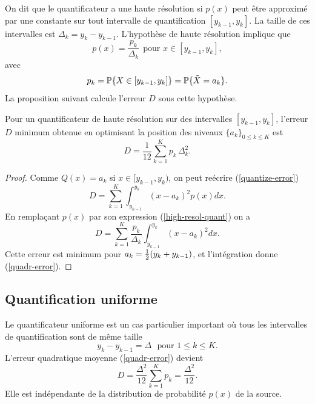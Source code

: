 On dit que le quantificateur a une haute
r\'esolution si
$p(x)$ peut \^etre approxim\'e par une constante sur tout intervalle
de quantification $[{y_{k-1}},{y_{k}}]$.
La taille de ces intervalles est $\Delta_k = y_k - y_{k-1}$.
L'hypoth\`ese de haute r\'esolution implique que
\begin{equation}
\label{high-resol-quant}
p(x) = \frac {p_k} {\Delta_k} ~~\mbox{pour $x \in [y_{k-1},{y_{k}}]$},
\end{equation}
avec
\[
p_k = \mathbb{P} \{X \in [{y_{k-1}},y_{k}] \} = \mathbb{P} \{ \tilde X = a_k \} .
\]
La proposition suivant calcule l'erreur $D$ sous cette hypoth\`ese.

\begin{proposition}
Pour un quantificateur de haute r\'esolution sur des intervalles
$[{y_{k-1}},{y_{k}}]$, l'erreur $D$
minimum obtenue en optimisant la position des niveaux
$\{ a_k \}_{0 \leq k \leq K}$ est
\begin{equation}
\label{quadr-error}
D = \frac 1 {12} \sum_{k=1}^{K} {p_k} \, {\Delta_k ^2} .
\end{equation}
\end{proposition}
\begin{proof}
Comme $Q(x) = a_k$ si
$x \in [y_{k-1},y_k)$, on peut re\'ecrire (\ref{quantize-error})
\[
D = \sum_{k=1}^{K} \int_{y_{k-1}}^{y_{k}} (x - a_k)^2 p(x) dx .
\]
En rempla\c{c}ant $p(x)$ par son expression
(\ref{high-resol-quant}) on a
\begin{equation}
D =
\sum_{k=1}^{K} \frac {p_k} {\Delta_k}
\int_{y_{k-1}}^{y_{k}} (x - a_k)^2  dx.
\end{equation}
Cette erreur est minimum
pour $a_k = {\frac 1 2} (y_{k}+{y_{k-1}})$, et l'int\'egration donne
(\ref{quadr-error}).
\end{proof}

\subsection{Quantification uniforme}
Le quantificateur uniforme est un cas particulier important o\`u
tous les intervalles de quantification sont de m\^eme taille
\[
y_{k} - y_{k-1} = \Delta ~~~\mbox{pour $1 \leq k \leq K$} .
\]
L'erreur quadratique moyenne (\ref{quadr-error})
devient
\begin{equation}
\label{unifoquantiz}
D = \frac {\Delta^2} {12} \sum_{k=1}^{K} {p_k}
= \frac {\Delta^2} {12} .
\end{equation}
Elle est ind\'ependante de la distribution de probabilit\'e
$p(x)$ de la source.
\\
\\
